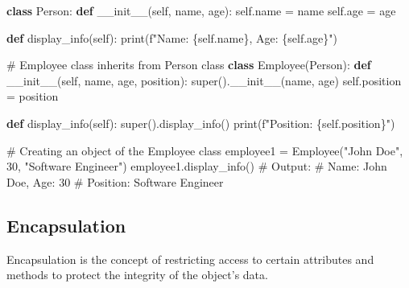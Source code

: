 \documentclass[
  letterpaper,
  DIV=11,
  numbers=noendperiod]{scrreprt}
\newenvironment{Shaded}{\begin{snugshade}}{\end{snugshade}}
\newcommand{\BuiltInTok}[1]{\textcolor[rgb]{0.00,0.23,0.31}{#1}}
\newcommand{\CommentTok}[1]{\textcolor[rgb]{0.37,0.37,0.37}{#1}}
\newcommand{\DecValTok}[1]{\textcolor[rgb]{0.68,0.00,0.00}{#1}}
\newcommand{\FunctionTok}[1]{\textcolor[rgb]{0.28,0.35,0.67}{#1}}
\newcommand{\KeywordTok}[1]{\textcolor[rgb]{0.00,0.23,0.31}{\textbf{#1}}}
\newcommand{\NormalTok}[1]{\textcolor[rgb]{0.00,0.23,0.31}{#1}}
\newcommand{\OperatorTok}[1]{\textcolor[rgb]{0.37,0.37,0.37}{#1}}
\newcommand{\SpecialCharTok}[1]{\textcolor[rgb]{0.37,0.37,0.37}{#1}}
\newcommand{\SpecialStringTok}[1]{\textcolor[rgb]{0.13,0.47,0.30}{#1}}
\newcommand{\StringTok}[1]{\textcolor[rgb]{0.13,0.47,0.30}{#1}}
\newcommand{\VariableTok}[1]{\textcolor[rgb]{0.07,0.07,0.07}{#1}}
\begin{document}
\begin{Shaded}
\begin{Highlighting}[]
\KeywordTok{class}\NormalTok{ Person:}
    \KeywordTok{def} \FunctionTok{\_\_init\_\_}\NormalTok{(}\VariableTok{self}\NormalTok{, name, age):}
        \VariableTok{self}\NormalTok{.name }\OperatorTok{=}\NormalTok{ name}
        \VariableTok{self}\NormalTok{.age }\OperatorTok{=}\NormalTok{ age}
    
    \KeywordTok{def}\NormalTok{ display\_info(}\VariableTok{self}\NormalTok{):}
        \BuiltInTok{print}\NormalTok{(}\SpecialStringTok{f"Name: }\SpecialCharTok{\{}\VariableTok{self}\SpecialCharTok{.}\NormalTok{name}\SpecialCharTok{\}}\SpecialStringTok{, Age: }\SpecialCharTok{\{}\VariableTok{self}\SpecialCharTok{.}\NormalTok{age}\SpecialCharTok{\}}\SpecialStringTok{"}\NormalTok{)}

\CommentTok{\# Employee class inherits from Person class}
\KeywordTok{class}\NormalTok{ Employee(Person):}
    \KeywordTok{def} \FunctionTok{\_\_init\_\_}\NormalTok{(}\VariableTok{self}\NormalTok{, name, age, position):}
        \BuiltInTok{super}\NormalTok{().}\FunctionTok{\_\_init\_\_}\NormalTok{(name, age)}
        \VariableTok{self}\NormalTok{.position }\OperatorTok{=}\NormalTok{ position}
    
    \KeywordTok{def}\NormalTok{ display\_info(}\VariableTok{self}\NormalTok{):}
        \BuiltInTok{super}\NormalTok{().display\_info()}
        \BuiltInTok{print}\NormalTok{(}\SpecialStringTok{f"Position: }\SpecialCharTok{\{}\VariableTok{self}\SpecialCharTok{.}\NormalTok{position}\SpecialCharTok{\}}\SpecialStringTok{"}\NormalTok{)}

\CommentTok{\# Creating an object of the Employee class}
\NormalTok{employee1 }\OperatorTok{=}\NormalTok{ Employee(}\StringTok{"John Doe"}\NormalTok{, }\DecValTok{30}\NormalTok{, }\StringTok{"Software Engineer"}\NormalTok{)}
\NormalTok{employee1.display\_info()}
\CommentTok{\# Output:}
\CommentTok{\# Name: John Doe, Age: 30}
\CommentTok{\# Position: Software Engineer}
\end{Highlighting}
\end{Shaded}

\subsection{Encapsulation}\label{encapsulation}

Encapsulation is the concept of restricting access to certain attributes
and methods to protect the integrity of the object's data.
\end{document}
